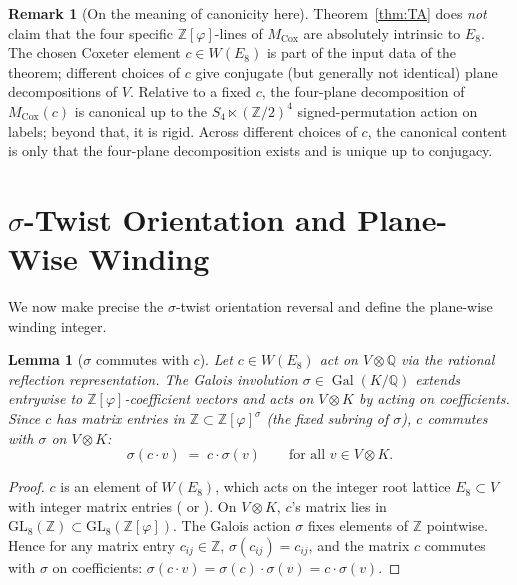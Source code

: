 \documentclass[11pt, a4paper]{amsart}
\newtheorem{lemma}[theorem]{Lemma}
\theoremstyle{definition}
\newtheorem{remark}[theorem]{Remark}
\newcommand{\Q}{\mathbb{Q}}
\newcommand{\Z}{\mathbb{Z}}
\newcommand{\Gal}{\operatorname{Gal}}
\newcommand{\Ophi}{\mathbb{Z}[\varphi]}
\newcommand{\Mcox}{M_{\mathrm{Cox}}}
\begin{document}
\begin{remark}[On the meaning of canonicity here]
\label{rmk:TA-canonicity}
Theorem~\ref{thm:TA} does \emph{not} claim that the four
specific $\Ophi$-lines of $\Mcox$ are absolutely intrinsic to
$E_8$. The chosen Coxeter element $c \in W(E_8)$ is part of
the input data of the theorem; different choices of $c$
give conjugate (but generally not identical) plane
decompositions of $V$. Relative to a fixed $c$, the
four-plane decomposition of $\Mcox(c)$ is canonical up to
the $S_4 \ltimes (\Z/2)^4$ signed-permutation action on
labels; beyond that, it is rigid. Across different choices
of $c$, the canonical content is only that the four-plane
decomposition exists and is unique up to conjugacy.
\end{remark}

\section{$\sigma$-Twist Orientation and Plane-Wise Winding}
\label{sec:sigma-twist}

We now make precise the $\sigma$-twist orientation reversal
and define the plane-wise winding integer.

\begin{lemma}[$\sigma$ commutes with $c$]
\label{lem:sigma-c-commute}
Let $c \in W(E_8)$ act on $V \otimes \Q$ via the rational
reflection representation. The Galois involution
$\sigma \in \Gal(K/\Q)$ extends entrywise to $\Ophi$-coefficient
vectors and acts on $V \otimes K$ by acting on coefficients.
Since $c$ has matrix entries in $\Z \subset \Ophi^\sigma$ (the
fixed subring of $\sigma$), $c$ commutes with $\sigma$ on
$V \otimes K$:
\[
  \sigma(c \cdot v) \;=\; c \cdot \sigma(v)
  \qquad \text{for all } v \in V \otimes K.
\]
\end{lemma}

\begin{proof}
$c$ is an element of $W(E_8)$, which acts on the integer root
lattice $E_8 \subset V$ with integer matrix entries
(\cite[Ch.~6, \S1]{Bourbaki46} or \cite[\S 1]{Humphreys}). On
$V \otimes K$, $c$'s matrix lies in $\mathrm{GL}_8(\Z)
\subset \mathrm{GL}_8(\Ophi)$. The Galois action $\sigma$
fixes elements of $\Z$ pointwise. Hence for any matrix
entry $c_{ij} \in \Z$, $\sigma(c_{ij}) = c_{ij}$, and the
matrix $c$ commutes with $\sigma$ on coefficients:
$\sigma(c \cdot v) = \sigma(c) \cdot \sigma(v) = c \cdot
\sigma(v)$.
\end{proof}
\end{document}
